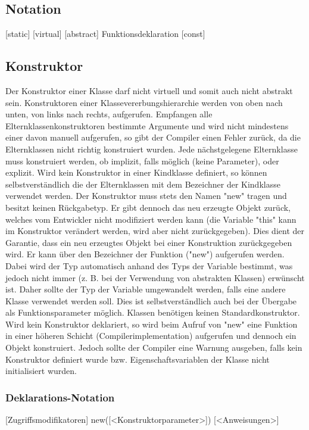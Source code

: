 \subsection{Notation}
[static] [virtual] [abstract] Funktionsdeklaration [const]

\subsection{Konstruktor}
Der Konstruktor einer Klasse darf nicht virtuell und somit auch nicht abstrakt sein.
Konstruktoren einer Klassevererbungshierarchie werden von oben nach unten, von links nach rechts, aufgerufen.
Empfangen alle Elternklassenkonstruktoren bestimmte Argumente und wird nicht mindestens einer davon manuell aufgerufen,
so gibt der Compiler einen Fehler zurück, da die Elternklassen nicht richtig konstruiert wurden.
Jede nächstgelegene Elternklasse muss konstruiert werden, ob implizit, falls möglich (keine Parameter), oder explizit.
Wird kein Konstruktor in einer Kindklasse definiert, so können selbstverständlich die der Elternklassen mit dem Bezeichner
der Kindklasse verwendet werden.
Der Konstruktor muss stets den Namen "new" tragen und besitzt keinen Rückgabetyp. Er gibt dennoch das neu erzeugte Objekt zurück,
welches vom Entwickler nicht modifiziert werden kann (die Variable "this" kann im Konstruktor verändert werden, wird aber nicht
zurückgegeben).
Dies dient der Garantie, dass ein neu erzeugtes Objekt bei einer Konstruktion zurückgegeben wird.
Er kann über den Bezeichner der Funktion ("new") aufgerufen werden.
Dabei wird der Typ automatisch anhand des Typs der Variable bestimmt, was jedoch nicht immer (z. B. bei der Verwendung von abstrakten Klassen) erwünscht ist. Daher sollte der Typ der Variable umgewandelt werden, falls eine andere Klasse verwendet werden soll.
Dies ist selbstverständlich auch bei der Übergabe als Funktionsparameter möglich.
Klassen benötigen keinen Standardkonstruktor. Wird kein Konstruktor deklariert, so wird beim Aufruf von "new" eine Funktion in einer höheren
Schicht (Compilerimplementation) aufgerufen und dennoch ein Objekt konstruiert. Jedoch sollte der Compiler eine Warnung ausgeben, falls kein
Konstruktor definiert wurde bzw. Eigenschaftsvariablen der Klasse nicht initialisiert wurden.

\subsubsection{Deklarations-Notation}
[Zugriffsmodifikatoren] new([<Konstruktorparameter>]) { [<Anweisungen>] }


